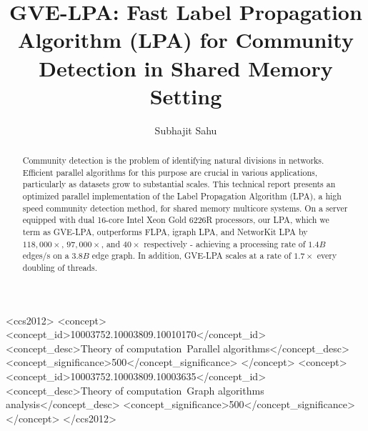 \documentclass[sigconf,nonacm]{acmart}
\begin{document}
\title[GVE-LPA: Fast Label Propagation Algorithm (LPA) for Community Detection in Shared Memory Setting]{GVE-LPA: Fast Label Propagation Algorithm (LPA) for Community Detection in Shared Memory Setting}


\author{Subhajit Sahu}



\begin{abstract}
Community detection is the problem of identifying natural divisions in networks. Efficient parallel algorithms for this purpose are crucial in various applications, particularly as datasets grow to substantial scales. This technical report presents an optimized parallel implementation of the Label Propagation Algorithm (LPA), a high speed community detection method, for shared memory multicore systems. On a server equipped with dual 16-core Intel Xeon Gold 6226R processors, our LPA, which we term as GVE-LPA, outperforms FLPA, igraph LPA, and NetworKit LPA by $118,000\times$, $97,000\times$, and $40\times$ respectively - achieving a processing rate of $1.4 B$ edges/s on a $3.8 B$ edge graph. In addition, GVE-LPA scales at a rate of $1.7\times$ every doubling of threads.
\end{abstract}

\begin{CCSXML}
<ccs2012>
<concept>
<concept_id>10003752.10003809.10010170</concept_id>
<concept_desc>Theory of computation~Parallel algorithms</concept_desc>
<concept_significance>500</concept_significance>
</concept>
<concept>
<concept_id>10003752.10003809.10003635</concept_id>
<concept_desc>Theory of computation~Graph algorithms analysis</concept_desc>
<concept_significance>500</concept_significance>
</concept>
</ccs2012>
\end{CCSXML}
\end{document}
